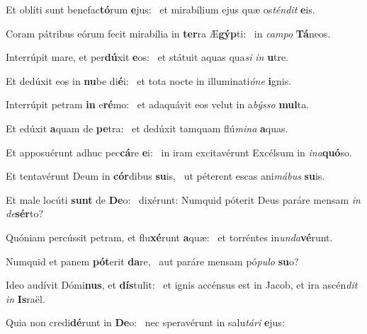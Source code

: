 \item Et oblíti sunt benefac\textbf{tó}rum \textbf{e}jus:~\psstar{} et mirabílium ejus quæ os\textit{téndit} \textbf{e}is.

\item Coram pátribus eórum fecit mirabília in \textbf{ter}ra Æ\textbf{gýp}ti:~\psstar{} in \textit{campo} \textbf{Tá}neos.

\item Interrúpit mare, et per\textbf{dú}xit \textbf{e}os:~\psstar{} et státuit aquas qua\textit{si} \textit{in} \textbf{u}tre.

\item Et dedúxit eos in \textbf{nu}be di\textbf{é}i:~\psstar{} et tota nocte in illuminati\textit{óne} \textbf{i}gnis.

\item Interrúpit petram \textbf{in} e\textbf{ré}mo:~\psstar{} et adaquávit eos velut in a\textit{býsso} \textbf{mul}ta.

\item Et edúxit \textbf{a}quam de \textbf{pe}tra:~\psstar{} et dedúxit tamquam flú\textit{mina} \textbf{a}quas.

\item Et apposuérunt adhuc pec\textbf{cá}re \textbf{e}i:~\psstar{} in iram excitavérunt Excélsum in \textit{ina}\textbf{quó}so.

\item Et tentavérunt Deum in \textbf{cór}dibus \textbf{su}is,~\psstar{} ut péterent escas ani\textit{mábus} \textbf{su}is.

\item Et male locúti \textbf{sunt} de \textbf{De}o:~\psstar{} dixérunt: Numquid póterit Deus paráre mensam \textit{in} \textit{de}\textbf{sér}to?

\item Quóniam percússit petram, et flu\textbf{xé}runt \textbf{a}quæ:~\psstar{} et torréntes in\textit{unda}\textbf{vé}runt.

\item Numquid et panem \textbf{pót}erit \textbf{da}re,~\psstar{} aut paráre mensam pó\textit{pulo} \textbf{su}o?

\item Ideo audívit Dómi\textbf{nus}, et \textbf{dís}tulit:~\psstar{} et ignis accénsus est in Jacob, et ira ascén\textit{dit} \textit{in} \textbf{Is}raël.

\item Quia non credi\textbf{dé}runt in \textbf{De}o:~\psstar{} nec speravérunt in salu\textit{tári} \textbf{e}jus:

